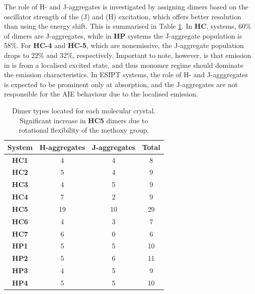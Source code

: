 The role of H- and J-aggregates is investigated by assigning dimers based on the oscillator strength of the \sone{} (J) and \stwo{} (H) excitation, which offers better resolution than using the energy shift. This is summarised in Table \ref{table: dimer_types}.  In \textbf{HC}, systems, 60\% of dimers are J-aggregates, while in \textbf{HP} systems the J-aggregate population is 58\%. For \textbf{HC-4} and \textbf{HC-5}, which are nonemissive, the J-aggregate population drops to 22\% and 32\%, respectively. Important to note, however, is that emission in \Kstar{} is from a localised excited state, and thus monomer regime should dominate the emission characteristics. In ESIPT systems, the role of H- and J-agggregates is expected to be prominent only at absorption, and the J-aggregates are not responsible for the AIE behaviour due to the localised emission.

\begin{table}[t]
\centering
\caption[Dimer types for \textbf{HC} and \textbf{HP} molecular crystals]{Dimer types located for each molecular crystal. Significant increase in \textbf{HC5} dimers due to rotational flexibility of the methoxy group.} 
  \label{table: dimer_types}
  \begin{tabular}{cccc}
  \hline
  System & H-aggregates & J-aggregates & Total\\
  \hline
  \textbf{HC1} & 4 & 4 & 8\\
  \textbf{HC2} & 5 & 4 & 9 \\
  \textbf{HC3} & 4 & 5 & 9\\
  \textbf{HC4} & 7 & 2 & 9\\
  \textbf{HC5} & 19 & 10 & 29 \\
  \textbf{HC6} & 4 & 3 & 7\\
  \textbf{HC7} & 6 & 0 & 6\\
  \hline
  \textbf{HP1} & 5 & 5 & 10\\
  \textbf{HP2} & 5 & 6 & 11\\
  \textbf{HP3} & 4 & 5 & 9\\
  \textbf{HP4} & 5 & 5 & 10\\
  \hline
  \end{tabular}
\end{table}

